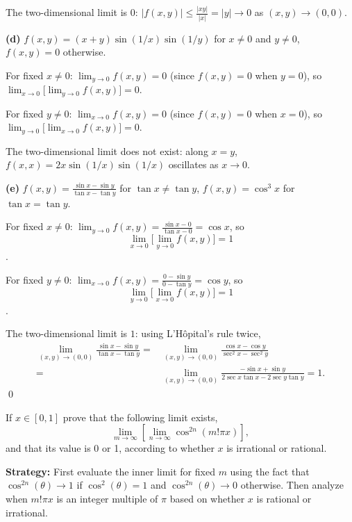 The two-dimensional limit is $0$: $|f(x,y)|\leq\frac{|xy|}{|x|}=|y|\to0$ as $(x,y)\to(0,0)$.

\bigskip\noindent\textbf{(d)} $f(x,y)=(x+y)\sin(1/x)\sin(1/y)$ for $x\neq0$ and $y\neq0$, $f(x,y)=0$ otherwise.

For fixed $x\neq0$: $\lim_{y\to0}f(x,y)=0$ (since $f(x,y)=0$ when $y=0$), so $\lim_{x\to0}\big[\lim_{y\to0}f(x,y)\big]=0$.

For fixed $y\neq0$: $\lim_{x\to0}f(x,y)=0$ (since $f(x,y)=0$ when $x=0$), so $\lim_{y\to0}\big[\lim_{x\to0}f(x,y)\big]=0$.

The two-dimensional limit does not exist: along $x=y$, $f(x,x)=2x\sin(1/x)\sin(1/x)$ oscillates as $x\to0$.

\bigskip\noindent\textbf{(e)} $f(x,y)=\frac{\sin x-\sin y}{\tan x-\tan y}$ for $\tan x\neq\tan y$, $f(x,y)=\cos^3x$ for $\tan x=\tan y$.

For fixed $x\neq0$: $\lim_{y\to0}f(x,y)=\frac{\sin x-0}{\tan x-0}=\cos x$, so $$\lim_{x\to0}\big[\lim_{y\to0}f(x,y)\big]=1$$.

For fixed $y\neq0$: $\lim_{x\to0}f(x,y)=\frac{0-\sin y}{0-\tan y}=\cos y$, so $$\lim_{y\to0}\big[\lim_{x\to0}f(x,y)\big]=1$$.

The two-dimensional limit is $1$: using L'Hôpital's rule twice, 
\begin{align*}
    \lim_{(x,y)\to(0,0)}\frac{\sin x-\sin y}{\tan x-\tan y}=&\lim_{(x,y)\to(0,0)}\frac{\cos x-\cos y}{\sec^2x-\sec^2y} \\
    =&\lim_{(x,y)\to(0,0)}\frac{-\sin x+\sin y}{2\sec x\tan x-2\sec y\tan y}=1.
\end{align*}
\qed



\begin{problembox}
\begin{problemstatement}
If \( x \in [0, 1] \) prove that the following limit exists,
\[\lim_{m \to \infty} \left[ \lim_{n \to \infty} \cos^{2n} (m! \pi x) \right],\]
and that its value is 0 or 1, according to whether \( x \) is irrational or rational.
\end{problemstatement}
\end{problembox}

\noindent\textbf{Strategy:} First evaluate the inner limit for fixed $m$ using the fact that $\cos^{2n}(\theta) \to 1$ if $\cos^2(\theta) = 1$ and $\cos^{2n}(\theta) \to 0$ otherwise. Then analyze when $m!\pi x$ is an integer multiple of $\pi$ based on whether $x$ is rational or irrational.

